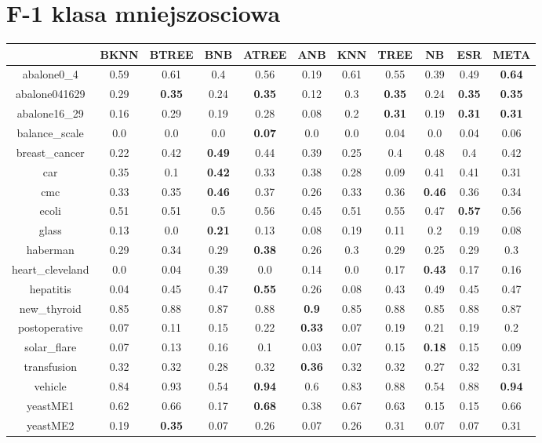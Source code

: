 \documentclass{article}%
\begin{document}
\section*{F{-}1 klasa mniejszosciowa}%
\begin{tabular}{c|cccccccccc}%
\hline%
&BKNN&BTREE&BNB&ATREE&ANB&KNN&TREE&NB&ESR&META\\%
\hline%
abalone0\_4&0.59&0.61&0.4&0.56&0.19&0.61&0.55&0.39&0.49&\textbf{0.64}\\%
\hline%
abalone041629&0.29&\textbf{0.35}&0.24&\textbf{0.35}&0.12&0.3&\textbf{0.35}&0.24&\textbf{0.35}&\textbf{0.35}\\%
\hline%
abalone16\_29&0.16&0.29&0.19&0.28&0.08&0.2&\textbf{0.31}&0.19&\textbf{0.31}&\textbf{0.31}\\%
\hline%
balance\_scale&0.0&0.0&0.0&\textbf{0.07}&0.0&0.0&0.04&0.0&0.04&0.06\\%
\hline%
breast\_cancer&0.22&0.42&\textbf{0.49}&0.44&0.39&0.25&0.4&0.48&0.4&0.42\\%
\hline%
car&0.35&0.1&\textbf{0.42}&0.33&0.38&0.28&0.09&0.41&0.41&0.31\\%
\hline%
cmc&0.33&0.35&\textbf{0.46}&0.37&0.26&0.33&0.36&\textbf{0.46}&0.36&0.34\\%
\hline%
ecoli&0.51&0.51&0.5&0.56&0.45&0.51&0.55&0.47&\textbf{0.57}&0.56\\%
\hline%
glass&0.13&0.0&\textbf{0.21}&0.13&0.08&0.19&0.11&0.2&0.19&0.08\\%
\hline%
haberman&0.29&0.34&0.29&\textbf{0.38}&0.26&0.3&0.29&0.25&0.29&0.3\\%
\hline%
heart\_cleveland&0.0&0.04&0.39&0.0&0.14&0.0&0.17&\textbf{0.43}&0.17&0.16\\%
\hline%
hepatitis&0.04&0.45&0.47&\textbf{0.55}&0.26&0.08&0.43&0.49&0.45&0.47\\%
\hline%
new\_thyroid&0.85&0.88&0.87&0.88&\textbf{0.9}&0.85&0.88&0.85&0.88&0.87\\%
\hline%
postoperative&0.07&0.11&0.15&0.22&\textbf{0.33}&0.07&0.19&0.21&0.19&0.2\\%
\hline%
solar\_flare&0.07&0.13&0.16&0.1&0.03&0.07&0.15&\textbf{0.18}&0.15&0.09\\%
\hline%
transfusion&0.32&0.32&0.28&0.32&\textbf{0.36}&0.32&0.32&0.27&0.32&0.31\\%
\hline%
vehicle&0.84&0.93&0.54&\textbf{0.94}&0.6&0.83&0.88&0.54&0.88&\textbf{0.94}\\%
\hline%
yeastME1&0.62&0.66&0.17&\textbf{0.68}&0.38&0.67&0.63&0.15&0.15&0.66\\%
\hline%
yeastME2&0.19&\textbf{0.35}&0.07&0.26&0.07&0.26&0.31&0.07&0.07&0.31\\%

\end{tabular}
\end{document}
